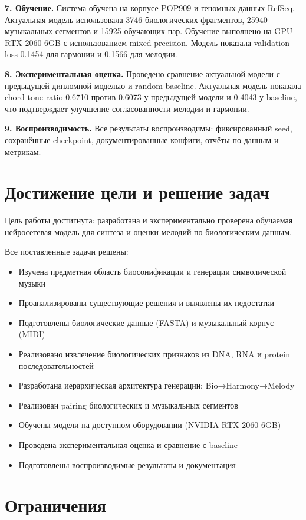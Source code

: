\textbf{7. Обучение.} Система обучена на корпусе POP909 и геномных данных RefSeq. Актуальная модель использовала 3746 биологических фрагментов, 25940 музыкальных сегментов и 15925 обучающих пар. Обучение выполнено на GPU RTX 2060 6GB с использованием mixed precision. Модель показала validation loss 0.1454 для гармонии и 0.1566 для мелодии.

\textbf{8. Экспериментальная оценка.} Проведено сравнение актуальной модели с предыдущей дипломной моделью и random baseline. Актуальная модель показала chord-tone ratio 0.6710 против 0.6073 у предыдущей модели и 0.4043 у baseline, что подтверждает улучшение согласованности мелодии и гармонии.

\textbf{9. Воспроизводимость.} Все результаты воспроизводимы: фиксированный seed, сохранённые checkpoint, документированные конфиги, отчёты по данным и метрикам.

\section*{Достижение цели и решение задач}

Цель работы достигнута: разработана и экспериментально проверена обучаемая нейросетевая модель для синтеза и оценки мелодий по биологическим данным.

Все поставленные задачи решены:
\begin{itemize}
\item Изучена предметная область биосонификации и генерации символической музыки
\item Проанализированы существующие решения и выявлены их недостатки
\item Подготовлены биологические данные (FASTA) и музыкальный корпус (MIDI)
\item Реализовано извлечение биологических признаков из DNA, RNA и protein последовательностей
\item Разработана иерархическая архитектура генерации: Bio→Harmony→Melody
\item Реализован pairing биологических и музыкальных сегментов
\item Обучены модели на доступном оборудовании (NVIDIA RTX 2060 6GB)
\item Проведена экспериментальная оценка и сравнение с baseline
\item Подготовлены воспроизводимые результаты и документация
\end{itemize}

\section*{Ограничения}

